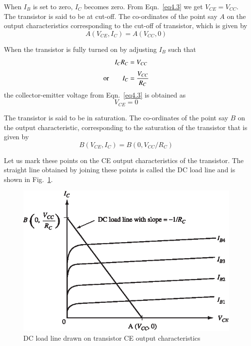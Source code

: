 When $I_{B}$ is set to zero, $I_{C}$ becomes zero. From Eqn.~\eqref{eq4.3} we get $V_{CE}=V_{CC}$. The transistor is said to be at cut-off. The co-ordinates of the point say $A$ on the output characteristics corresponding to the cut-off of transistor, which is given by
\begin{equation}
A(V_{CE},I_{C})=A(V_{CC},0)\label{eq4.4}
\end{equation}

When the transistor is fully turned on by adjusting $I_{B}$ such that
\begin{align}
I_{C}R_{C} &= V_{CC}\notag\\[3pt]
\text{or}\qquad I_{C} &= \frac{V_{CC}}{R_{C}}\label{eq4.5}
\end{align}
the collector-emitter voltage from Eqn.~\eqref{eq4.3} is obtained as
\begin{equation}
V_{CE}=0\label{eq4.6}
\end{equation}

The transistor is said to be in saturation. The co-ordinates of the point say $B$ on the output characteristic, corresponding to the saturation of the transistor that is given by
\begin{equation}
B(V_{CE},I_{C})=B(0,V_{CC}/R_{C})\label{eq4.7}
\end{equation}

Let us mark these points on the CE output characteristics of the transistor. The straight line obtained by joining these points is called the DC load line and is shown in Fig.~\ref{fig4.2}.
\begin{figure}[H]
\centering
\includegraphics{chap3/S3-EE-03-036.eps}
\caption{DC load line drawn on transistor CE output characteristics}\label{fig4.2}
\end{figure}

